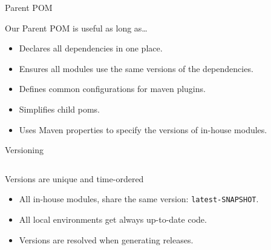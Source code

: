 \documentclass[presentation,c]{beamer}
\begin{document}
{
\begin{frame}[label=sec-5-3]{Parent POM}

\begin{block}{Our Parent POM is useful as long as\ldots{}}

\begin{itemize}
\item Declares all dependencies in one place.
\item Ensures all modules use the same versions of the dependencies.
\item Defines common configurations for maven plugins.
\item Simplifies child poms.
\item Uses Maven properties to specify the versions of in-house modules.
\end{itemize}
\end{block}
\end{frame}
} %


{
\begin{frame}[label=sec-5-4]{Versioning}

\begin{columns}
\begin{column}{0.5\textwidth}
\begin{block}{Versions are unique and time-ordered}

\begin{itemize}
\item All in-house modules, share the same version: \texttt{latest-SNAPSHOT}.
\item All local environments get always up-to-date code.
\item Versions are resolved when generating releases.
\end{itemize}
\end{block}
\end{column}

\begin{column}{0.5\textwidth}

\end{column}
\end{columns}
\end{frame}
} %
\end{document}
